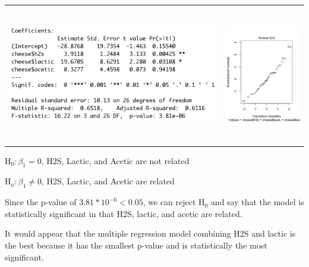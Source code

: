 \documentclass[12pt]{article}
\begin{document}
	\begin{center}
	\begin{tabular}{cc}
		\includegraphics[width=.5\textwidth, height=60mm, keepaspectratio]{images/1161/1161summary.png} & \includegraphics[width=.5\textwidth, height=60mm, keepaspectratio]{images/1161/qqplot.png}\\
	\end{tabular}
	\end{center}\par
	H$_{0}: \beta_{1} = 0$, H2S, Lactic, and Acetic are not related\par
	H$_{a}: \beta_{1} \ne 0$, H2S, Lactic, and Acetic are related\par
	Since the p-value of $3.81*10^{-6} < 0.05$, we can reject H$_{0}$ and say that the model is statistically significant in that H2S, lactic, and acetic are related.\par
	It would appear that the multiple regression model combining H2S and lactic is the best because it has the smallest p-value and is statistically the most significant.\par
	
\end{document}
